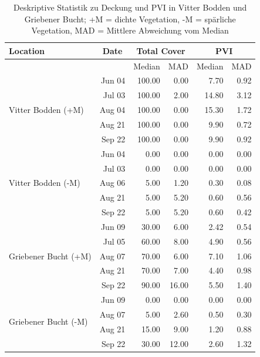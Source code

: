 \begin{table}[!htb]{\textwidth}
\centering
\caption[Deskriptive Statistik, Deckung und PVI in Grieben und Vitte]{Deskriptive Statistik zu Deckung und PVI in Vitter Bodden und Griebener Bucht; +M = dichte Vegetation, -M = spärliche Vegetation, MAD = Mittlere Abweichung vom Median}
\begin{tabular}{lrrrrr}
\toprule
Location & \multicolumn{1}{c}{Date}	& \multicolumn{2}{c}{Total Cover} 	& \multicolumn{2}{c}{PVI}\\
\midrule
							&			& Median 		& MAD				& Median		& MAD\\
\midrule
\multirow{5}{*}{Vitter Bodden (+M)} & Jun 04 	& 100.00 		& 0.00				& 7.70			& 0.92\\
 							& Jul 03    & 100.00	    & 2.00				& 14.80			& 3.12\\
							& Aug 04	& 100.00		& 0.00				& 15.30			& 1.72\\
							& Aug 21	& 100.00		& 0.00				& 9.90			& 0.72\\
							& Sep 22	& 100.00		& 0.00				& 9.90			& 0.92\\
\midrule
\multirow{5}{*}{Vitter Bodden (-M)} & Jun 04	& 0.00			& 0.00				& 0.00			& 0.00\\
							& Jul 03	& 0.00			& 0.00				& 0.00			& 0.00\\
							& Aug 06	& 5.00			& 1.20				& 0.30			& 0.08\\
							& Aug 21	& 5.00			& 5.20				& 0.60			& 0.56\\
							& Sep 22	& 5.00			& 5.20				& 0.60			& 0.42\\
\midrule
\multirow{5}{*}{Griebener Bucht (+M)}& Jun 09	& 30.00			& 6.00				& 2.42			& 0.54\\
							& Jul 05	& 60.00			& 8.00				& 4.90			& 0.56\\
							& Aug 07	& 70.00			& 6.00				& 7.10			& 1.06\\
							& Aug 21	& 70.00			& 7.00				& 4.40			& 0.98\\
							& Sep 22	& 90.00			& 16.00				& 5.50			& 1.40\\
\midrule	
\multirow{4}{*}{Griebener Bucht (-M)}& Jun 09	& 0.00			& 0.00				& 0.00			& 0.00\\
							& Aug 07	& 5.00			& 2.60				& 0.50			& 0.30\\
							& Aug 21	& 15.00			& 9.00				& 1.20			& 0.88\\
							& Sep 22	& 30.00			& 12.00				& 2.60			& 1.32\\
\bottomrule
\end{tabular}
\label{tab:statistik_G,V_Deckung,PVI}
\end{table}

